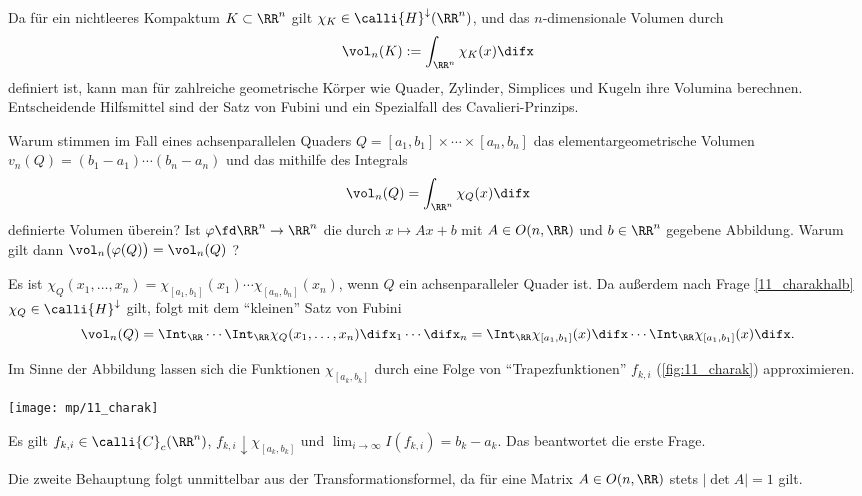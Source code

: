 Da f\"ur ein nichtleeres Kompaktum $K\subset\RR^n$ gilt 
$\chi_K \in \calli{H}^\downarrow (\RR^n)$, und das 
$n$-dimensionale Volumen durch 
\[
\vol_n (K) := \int_{\RR^n} \chi_K (x) \difx 
\]
\noindent%
definiert ist, kann man f\"ur zahlreiche geometrische K\"orper wie 
Quader, Zylinder, Simplices und Kugeln ihre Volumina berechnen. 
Entscheidende Hilfsmittel sind der Satz von Fubini 
und ein Spezialfall des 
Cavalieri-Prinzips.

\begin{frage}\label{11_quader}
  Warum stimmen im Fall eines achsenparallelen Quaders 
  $Q=[a_1,b_1]\times \cdots \times [a_n,b_n]$ das elementargeometrische 
  Volumen $v_n(Q) = (b_1-a_1)\cdots (b_n-a_n)$ und das mithilfe des 
  Integrals 
  \[
  \vol_n(Q) = \int_{\RR^n} \chi_Q (x) \difx 
  \]
  definierte Volumen \"uberein? Ist $\varphi\fd \RR^n\to\RR^n$ die durch 
  $x\mapsto Ax+b$ mit $A\in O(n,\RR)$ und $b\in\RR^n$ gegebene Abbildung. 
  Warum gilt dann $\vol_n\big( \varphi(Q) \big) = \vol_n (Q)$ ?
\end{frage}

\begin{antwort}
  Es ist $\chi_Q(x_1,\ldots,x_n) = 
  \chi_{[a_1,b_1]} (x_1) \cdots \chi_{[a_n,b_n]} (x_n)$, wenn 
  $Q$ ein achsenparalleler Quader ist. Da außerdem nach Frage 
  \ref{11_charakhalb} $\chi_Q\in\calli{H}^\downarrow$ gilt,
  folgt mit dem "`kleinen"' Satz von Fubini 
  \[
  \vol_n (Q) = \Int_\RR \cdots \Int_\RR 
  \chi_Q(x_1,\ldots,x_n) \difx_1\cdots \difx_n = 
  \Int_\RR \chi_{[a_1,b_1]} (x) \difx \cdots 
  \Int_\RR \chi_{[a_1,b_1]} (x) \difx. 
  \]

  Im Sinne der Abbildung lassen sich die Funktionen $\chi_{[a_k,b_k]}$ 
  durch eine Folge von "`Trapezfunktionen"' $f_{k,i}$ 
  (\sieheAbbildung\ref{fig:11_charak}) approximieren.

  \begin{center}
    \texttt{[image: mp/11\_charak]}
    \label{fig:11_charak}
  \end{center}


  Es gilt $f_{k,i}\in\calli{C}_c(\RR^n)$, 
  $f_{k,i} \downarrow \chi_{[a_k,b_k]}$ und 
  $\lim_{i\to\infty} I(f_{k,i})= b_k-a_k$. Das beantwortet die 
  erste Frage.     

  Die zweite Behauptung folgt unmittelbar aus der Transformationsformel, 
  da für eine Matrix $A\in O(n,\RR)$ stets $| \det A | =1$ gilt. 
  \AntEnd
\end{antwort}

